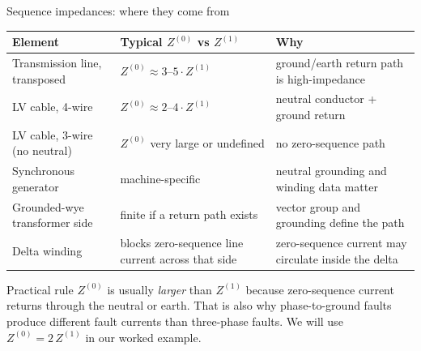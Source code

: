 \documentclass[aspectratio=169,10pt]{beamer}
\begin{document}
\begin{frame}{Sequence impedances: where they come from}
\centering
\scriptsize
\begin{tabular}{@{}p{}p{}p{}@{}}
\toprule
Element & Typical $Z^{(0)}$ vs $Z^{(1)}$ & Why \\
\midrule
Transmission line, transposed & $Z^{(0)} \approx 3\text{--}5 \cdot Z^{(1)}$ & ground/earth return path is high-impedance \\
LV cable, 4-wire & $Z^{(0)} \approx 2\text{--}4 \cdot Z^{(1)}$ & neutral conductor + ground return \\
LV cable, 3-wire (no neutral) & $Z^{(0)}$ very large or undefined & no zero-sequence path \\
Synchronous generator & machine-specific & neutral grounding and winding data matter \\
Grounded-wye transformer side & finite if a return path exists & vector group and grounding define the path \\
Delta winding & blocks zero-sequence line current across that side & zero-sequence current may circulate inside the delta \\
\bottomrule
\end{tabular}
\vspace{0.6em}
\begin{alertblock}{Practical rule}
$Z^{(0)}$ is usually \emph{larger} than $Z^{(1)}$ because zero-sequence current returns through the neutral or earth. That is also why phase-to-ground faults produce different fault currents than three-phase faults. We will use $Z^{(0)} = 2\,Z^{(1)}$ in our worked example.
\end{alertblock}
\end{frame}
\end{document}
